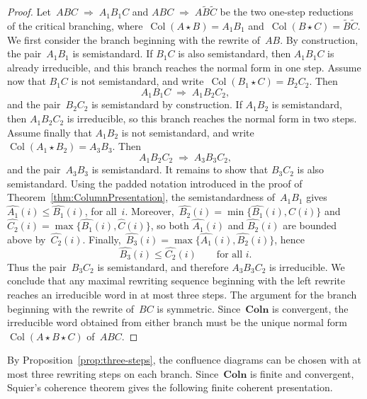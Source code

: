 \documentclass[a4paper, twoside, 11pt, english]{article}
\theoremstyle{plain}
\theoremstyle{definition}
\newcommand{\dfl}{\Rightarrow}
\DeclareMathOperator{\col}{Col}
\newcommand{\Colo}{\mathbf{Coln}}
\begin{document}
\begin{proof}
Let~$ABC \;\dfl\; A_1B_1C$ and $ABC \;\dfl\; A\widetilde B\widetilde C$ be the two one-step reductions of the critical branching, where~$\col(A\star B)=A_1B_1$ and~$\col(B\star C)=\widetilde B\widetilde C$.
We first consider the branch beginning with the rewrite of~$AB$.
By construction, the pair~$A_1B_1$ is semistandard.
If $B_1C$ is also semistandard, then $A_1B_1C$ is already irreducible, and this branch reaches the normal form in one step.
Assume now that $B_1C$ is not semistandard, and write~$\col(B_1\star C)=B_2C_2$.
Then
\[
A_1B_1C \;\dfl\; A_1B_2C_2,
\]
and the pair~$B_2C_2$ is semistandard by construction.
If $A_1B_2$ is semistandard, then $A_1B_2C_2$ is irreducible, so this branch reaches the normal form in two steps.
Assume finally that $A_1B_2$ is not semistandard, and write~$\col(A_1\star B_2)=A_3B_3$.
Then
\[
A_1B_2C_2 \;\dfl\; A_3B_3C_2,
\]
and the pair~$A_3B_3$ is semistandard.
It remains to show that $B_3C_2$ is also semistandard.
Using the padded notation introduced in the proof of Theorem~\ref{thm:ColumnPresentation}, the semistandardness of~$A_1B_1$ gives~$\widehat{A_1}(i)\le \widehat{B_1}(i)$, for all~$i$.
Moreover,~$\widehat{B_2}(i)=\min\{\widehat{B_1}(i),\widehat{C}(i)\}$ and~$\widehat{C_2}(i)=\max\{\widehat{B_1}(i),\widehat{C}(i)\}$, 
so both $\widehat{A_1}(i)$ and $\widehat{B_2}(i)$ are bounded above by~$\widehat{C_2}(i)$.
Finally,~$\widehat{B_3}(i)=\max\{\widehat{A_1}(i),\widehat{B_2}(i)\}$,
hence
\[
\widehat{B_3}(i)\le \widehat{C_2}(i)
\qquad\text{for all } i.
\]
Thus the pair~$B_3C_2$ is semistandard, and therefore $A_3B_3C_2$ is irreducible.
We conclude that any maximal rewriting sequence beginning with the left rewrite reaches an irreducible word in at most three steps.
The argument for the branch beginning with the rewrite of~$BC$ is symmetric.
Since~$\Colo$ is convergent, the irreducible word obtained from either branch must be the unique normal form~$\col(A\star B\star C)$ of~$ABC$.
\end{proof}


By Proposition~\ref{prop:three-steps}, the confluence diagrams
can be chosen with at most three rewriting steps on each branch.
Since~$\Colo$ is finite and convergent, Squier's coherence theorem
gives the following finite coherent presentation.
\end{document}
